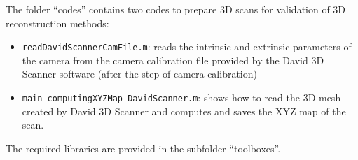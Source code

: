 \documentclass[11pt]{article}
\begin{document}
The folder ``codes'' contains two codes to prepare 3D scans for validation of 3D reconstruction methods:
\begin{itemize}
\item {\tt readDavidScannerCamFile.m}: reads the intrinsic and extrinsic parameters of the camera from the camera calibration file provided by the David 3D Scanner software (after the step of camera calibration)
\item {\tt main\_computingXYZMap\_DavidScanner.m}: shows how to read the 3D mesh created by David 3D Scanner and computes and saves the XYZ map of the scan.
\end{itemize}

The required libraries are provided in the subfolder ``toolboxes''.
\end{document}
